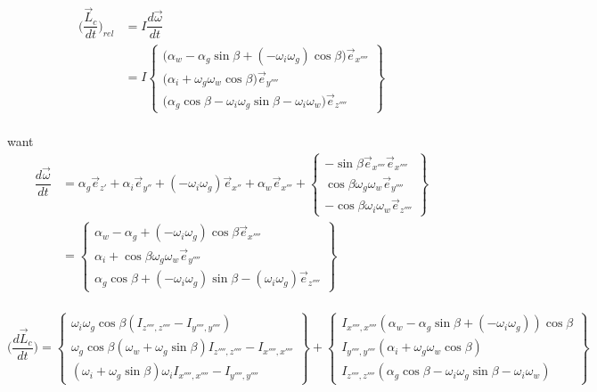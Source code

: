 \documentclass[a4paper,10pt]{article}
\begin{document}
\begin{equation}
\begin{aligned}
\Big( \dfrac{\vec{L}_c}{dt}\Big)_{rel} &= I \dfrac{d\vec{\omega}}{dt}\\
&= I \begin{Bmatrix}
\Big(\alpha_w - \alpha_g \sin{\beta} + (-\omega_i \omega_g)\cos{\beta}\Big)\vec{e}_{x''''}\\
\Big(\alpha_i + \omega_g\omega_w\cos{\beta}\Big)\vec{e}_{y''''}\\
\Big(\alpha_g \cos{\beta} - \omega_i\omega_g\sin{\beta}-\omega_i\omega_w\Big) \vec{e}_{z''''}
\end{Bmatrix}
\end{aligned}
\end{equation}\\
want \\
\begin{equation}
\begin{aligned}
\dfrac{d\vec{\omega}}{dt}&=\alpha_g \vec{e}_{z'} + \alpha_i \vec{e}_{y''} + (-\omega_i\omega_g)\vec{e}_{x''}+\alpha_w\vec{e}_{x'''} + \begin{Bmatrix}
-\sin{\beta}\vec{e}_{x''''}\vec{e}_{x''''}\\
\cos{\beta}\omega_g\omega_w \vec{e}_{y''''}\\
-\cos{\beta}\omega_i\omega_w \vec{e}_{z''''}
\end{Bmatrix}\\
&=\begin{Bmatrix}
\alpha_w - \alpha_g + (-\omega_i\omega_g)\cos{\beta} \vec{e}_{x''''}\\
\alpha_i + \cos{\beta}\omega_g\omega_w \vec{e}_{y''''}\\
\alpha_g\cos{\beta} + (-\omega_i\omega_g)\sin{\beta}- (\omega_i\omega_g) \vec{e}_{z''''}
\end{Bmatrix}
\end{aligned}
\end{equation}\\
\begin{equation}
\Big(\dfrac{d\vec{L}_c}{dt}\Big) = \begin{Bmatrix}
\omega_i\omega_g\cos{\beta}(I_{z'''',z''''}-I_{y'''',y''''})\\
\omega_g\cos{\beta}(\omega_w + \omega_g\sin{\beta})I_{z'''',z''''}-I_{x'''',x''''}\\
(\omega_i + \omega_g \sin{\beta})\omega_i I_{x'''',x''''}-I_{y'''',y''''}
\end{Bmatrix}
+ \begin{Bmatrix}
I_{x'''',x''''}(\alpha_w - \alpha_g \sin{\beta}+ (-\omega_i\omega_g))\cos{\beta}\\
I_{y'''',y''''}(\alpha_i + \omega_g\omega_w\cos{\beta})\\
I_{z'''',z''''}(\alpha_g\cos{\beta}- \omega_i\omega_g\sin{\beta}-\omega_i\omega_w)
\end{Bmatrix}
\end{equation}
\end{document}
